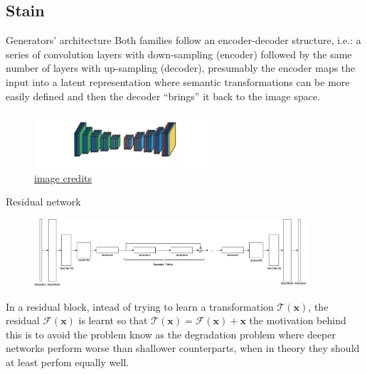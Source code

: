 \documentclass[t]{beamer}
\newcommand{\tensor}[1]{\mathbf{#1}}
\begin{document}
\subsection{Stain}

\begin{frame}{Generators' architecture}
Both families follow an encoder-decoder
structure, i.e.: a series of convolution layers with down-sampling (encoder)
followed by the same number of layers with up-sampling\footnotemark{} (decoder),
presumably the encoder maps the input into a latent representation where
semantic transformations can be more easily defined and then the decoder
``brings'' it back to the image space.

\begin{figure}
\centering
\includegraphics[width=0.6\textwidth]{encoder-decoder}
\caption{\href{https://arxiv.org/abs/1511.00561}{image credits}}
\end{figure}

\end{frame}

\begin{frame}{Residual network}

\begin{figure}
\centering
\includegraphics[width=0.9\textwidth]{residual_stain-nn}
\end{figure}

In a residual block, intead of trying to learn
a transformation $\mathcal{T}(\tensor{x})$, the residual
$\mathcal{F}(\tensor{x})$ is learnt so that
$\mathcal{T}(\tensor{x}) = \mathcal{F}(\tensor{x}) + \tensor{x}$
the motivation behind this is to
avoid the problem know as the degradation problem where deeper networks
perform worse than shallower counterparts, when in theory they should at
least perfom equally well.

\end{frame}
\end{document}
